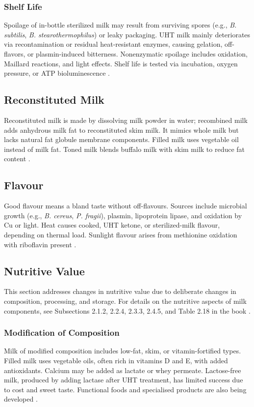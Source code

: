 \subsubsection*{Shelf Life}
Spoilage of in-bottle sterilized milk may result from surviving spores (e.g., \textit{B. subtilis}, \textit{B. stearothermophilus}) or leaky packaging. UHT milk mainly deteriorates via recontamination or residual heat-resistant enzymes, causing gelation, off-flavors, or plasmin-induced bitterness. Nonenzymatic spoilage includes oxidation, Maillard reactions, and light effects. Shelf life is tested via incubation, oxygen pressure, or ATP bioluminescence \cite*{curr_rm_01_dairy_science_technology}.

\subsection{Reconstituted Milk}
Reconstituted milk is made by dissolving milk powder in water; recombined milk adds anhydrous milk fat to reconstituted skim milk. It mimics whole milk but lacks natural fat globule membrane components. Filled milk uses vegetable oil instead of milk fat. Toned milk blends buffalo milk with skim milk to reduce fat content \cite*{curr_rm_01_dairy_science_technology}. 

\subsection{Flavour}
Good flavour means a bland taste without off-flavours. Sources include microbial growth (e.g., \textit{B. cereus}, \textit{P. fragii}), plasmin, lipoprotein lipase, and oxidation by Cu or light. Heat causes cooked, UHT ketone, or sterilized-milk flavour, depending on thermal load. Sunlight flavour arises from methionine oxidation with riboflavin present \cite*{curr_rm_01_dairy_science_technology}.

\subsection{Nutritive Value}
This section addresses changes in nutritive value due to deliberate changes in composition, processing, and storage. For details on the nutritive aspects of milk components, see Subsections 2.1.2, 2.2.4, 2.3.3, 2.4.5, and Table 2.18 in the book \cite*{curr_rm_01_dairy_science_technology}.

\subsubsection*{Modification of Composition}
Milk of modified composition includes low-fat, skim, or vitamin-fortified types. Filled milk uses vegetable oils, often rich in vitamins D and E, with added antioxidants. Calcium may be added as lactate or whey permeate. Lactose-free milk, produced by adding lactase after UHT treatment, has limited success due to cost and sweet taste. Functional foods and specialised products are also being developed \cite*{curr_rm_01_dairy_science_technology}.

